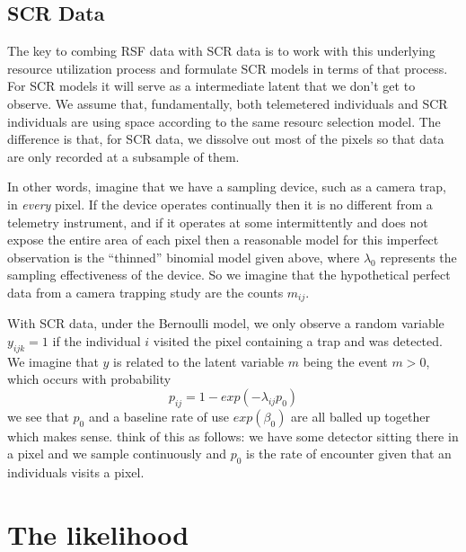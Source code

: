 \subsection{SCR Data}

The key to combing RSF data with SCR data is to 
work with this underlying resource utilization process and formulate SCR
models in terms of that process. For SCR models it will serve as a
intermediate latent that we don't get to observe. We assume that,
fundamentally, both telemetered individuals and SCR individuals are
using space according to the same resourc selection model. The 
difference is that, for SCR data, we dissolve out most of the pixels
so that data are only recorded at a subsample of them.  

In other words, imagine that we have a sampling device, such as a
camera trap, in {\it every} pixel. If the device operates continually
then it is no different from a telemetry instrument, and if it
operates at some intermittently and does not expose the entire area of
each pixel then a reasonable model for this imperfect observation is
the ``thinned'' binomial model given above, where $\lambda_{0}$
represents the sampling effectiveness of the device. So we imagine
that the hypothetical perfect data from a camera trapping study are
the counts $m_{ij}$. 


With SCR data, under the Bernoulli model, 
 we only observe a random variable 
$y_{ijk} = 1$  if the individual $i$ visited the pixel
containing a trap and was detected. 
We imagine that $y$ is related to the latent variable $m$ being the
event $m>0$, which occurs with probability 
\[
 p_{ij} = 1-exp(- \lambda_{ij} p_{0} ) 
\]
we see that $p_{0}$ and a baseline rate of use  $exp(\beta_{0})$ are
all balled up together which makes sense. 
think of this as follows: we have some detector sitting there in a
pixel and we sample continuously and $p_{0}$ is the rate of encounter
given that an individuals visits a pixel. 


\section{The likelihood}


